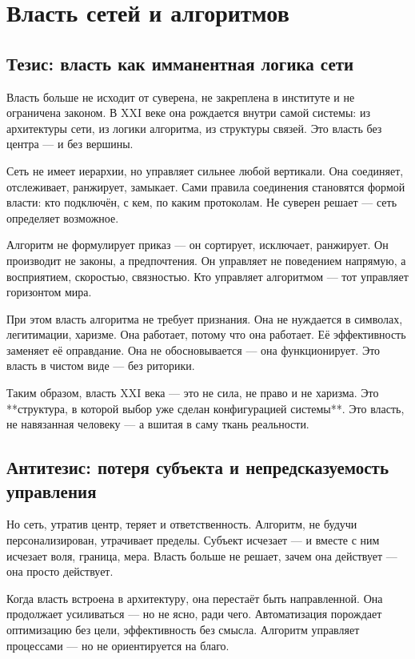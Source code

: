 \chapter{Власть сетей и алгоритмов}

\section{Тезис: власть как имманентная логика сети}

Власть больше не исходит от суверена, не закреплена в институте и не ограничена законом. В XXI веке она рождается внутри самой системы: из архитектуры сети, из логики алгоритма, из структуры связей. Это власть без центра — и без вершины.

Сеть не имеет иерархии, но управляет сильнее любой вертикали. Она соединяет, отслеживает, ранжирует, замыкает. Сами правила соединения становятся формой власти: кто подключён, с кем, по каким протоколам. Не суверен решает — сеть определяет возможное.

Алгоритм не формулирует приказ — он сортирует, исключает, ранжирует. Он производит не законы, а предпочтения. Он управляет не поведением напрямую, а восприятием, скоростью, связностью. Кто управляет алгоритмом — тот управляет горизонтом мира.

При этом власть алгоритма не требует признания. Она не нуждается в символах, легитимации, харизме. Она работает, потому что она работает. Её эффективность заменяет её оправдание. Она не обосновывается — она функционирует. Это власть в чистом виде — без риторики.

Таким образом, власть XXI века — это не сила, не право и не харизма. Это **структура, в которой выбор уже сделан конфигурацией системы**. Это власть, не навязанная человеку — а вшитая в саму ткань реальности.

\section{Антитезис: потеря субъекта и непредсказуемость управления}

Но сеть, утратив центр, теряет и ответственность. Алгоритм, не будучи персонализирован, утрачивает пределы. Субъект исчезает — и вместе с ним исчезает воля, граница, мера. Власть больше не решает, зачем она действует — она просто действует.

Когда власть встроена в архитектуру, она перестаёт быть направленной. Она продолжает усиливаться — но не ясно, ради чего. Автоматизация порождает оптимизацию без цели, эффективность без смысла. Алгоритм управляет процессами — но не ориентируется на благо.

